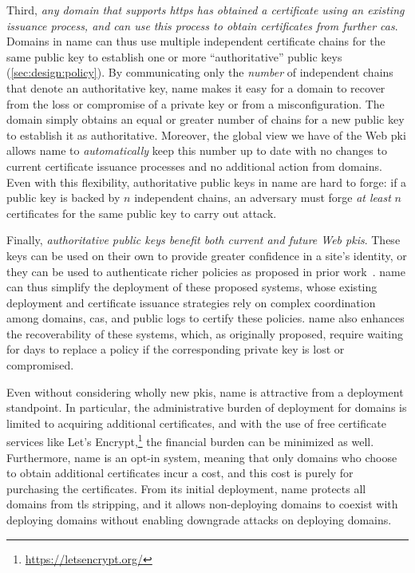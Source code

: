 Third, \emph{any domain that supports \ac{https} has obtained a certificate
using an existing issuance process, and can use this process to obtain
certificates from further \acp{ca}}. Domains in \ac{name} can thus use multiple
independent certificate chains for the same public key to establish one or more
``authoritative'' public keys (\autoref{sec:design:policy}). By communicating
only the \emph{number} of independent chains that denote an authoritative key,
\ac{name} makes it easy for a domain to recover from the loss or compromise of a
private key or from a misconfiguration. The domain simply obtains an equal or
greater number of chains for a new public key to establish it as authoritative.
Moreover, the global view we have of the Web \ac{pki} allows \ac{name} to
\emph{automatically} keep this number up to date with no changes to current
certificate issuance processes and no additional action from domains. Even with
this flexibility, authoritative public keys in \ac{name} are hard to forge: if a
public key is backed by $n$ independent chains, an adversary must forge \emph{at
least} $n$ certificates for the same public key to carry out  attack.

Finally, \emph{authoritative public keys benefit both current and future Web
\acp{pki}}. These keys can be used on their own to provide greater confidence in
a site's identity, or they can be used to authenticate richer policies as
proposed in prior work~\cite{basin2014arpki, szalachowski2014policert}.
\ac{name} can thus simplify the deployment of these proposed systems, whose
existing deployment and certificate issuance strategies rely on complex
coordination among domains, \acp{ca}, and public logs to certify these policies.
\ac{name} also enhances the recoverability of these systems, which, as
originally proposed, require waiting for days to replace a policy if the
corresponding private key is lost or compromised.

Even without considering wholly new \acp{pki}, \ac{name} is attractive from a
deployment standpoint. In particular, the administrative burden of deployment
for domains is limited to acquiring additional certificates, and with the use of
free certificate services like Let's
Encrypt,\footnote{\url{https://letsencrypt.org/}} the financial burden can be
minimized as well. Furthermore, \ac{name} is an opt-in system, meaning that only
domains who choose to obtain additional certificates incur a cost, and this cost
is purely for purchasing the certificates. From its initial deployment,
\ac{name} protects all domains from \ac{tls} stripping, and it allows
non-deploying domains to coexist with deploying domains without enabling
downgrade attacks on deploying domains.

